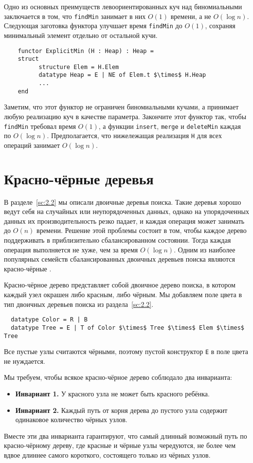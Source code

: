\begin{exercise}\label{ex:3.7}
  Одно из основных преимуществ левоориентированных куч над
  биномиальными заключается в том, что \lstinline!findMin! занимает в
  них $O(1)$ времени, а не $O(\log n)$. Следующая заготовка функтора
  улучшает время \lstinline!findMin! до $O(1)$, сохраняя минимальный
  элемент отдельно от остальной кучи.
  \begin{lstlisting}
    functor ExplicitMin (H : Heap) : Heap =
    struct
          structure Elem = H.Elem
          datatype Heap = E | NE of Elem.t $\times$ H.Heap
          ...
    end
  \end{lstlisting}
  Заметим, что этот функтор не ограничен биномиальными кучами, а
  принимает любую реализацию куч в качестве параметра. Закончите этот
  функтор так, чтобы \lstinline!findMin! требовал время $O(1)$, а
  функции \lstinline!insert!, \lstinline!merge! и
  \lstinline!deleteMin! каждая по $O(\log n)$. Предполагается, что
  нижележащая реализация \lstinline!H! для всех операций занимает
  $O(\log n)$.
\end{exercise}

\section{Красно-чёрные деревья}
\label{sc:3.3}

В разделе~\ref{sc:2.2} мы описали двоичные деревья поиска. Такие
деревья хорошо ведут себя на случайных или неупорядоченных данных,
однако на упорядоченных данных их производительность резко падает, и
каждая операция может занимать до $O(n)$  времени.  Решение этой
проблемы состоит в том, чтобы каждое дерево поддерживать в
приблизительно сбалансированном состоянии. Тогда каждая операция
выполняется не хуже, чем за время $O(\log n)$.  Одним из наиболее
популярных семейств сбалансированных двоичных деревьев поиска являются
красно-чёрные \cite{GuibasSedgewick1978}.

Красно-чёрное дерево представляет собой двоичное дерево поиска, в
котором каждый узел окрашен либо красным, либо чёрным. Мы добавляем
поле цвета в тип двоичных деревьев поиска из раздела~\ref{sc:2.2}.
\begin{lstlisting}
  datatype Color = R | B
  datatype Tree = E | T of Color $\times$ Tree $\times$ Elem $\times$ Tree
\end{lstlisting}
Все пустые узлы считаются чёрными, поэтому пустой конструктор
\lstinline!E! в поле цвета не нуждается.

Мы требуем, чтобы всякое красно-чёрное дерево соблюдало два
инварианта:
\begin{itemize}
\item \textbf{Инвариант 1.} У красного узла не может быть красного ребёнка.
\item \textbf{Инвариант 2.} Каждый путь от корня дерева до пустого
  узла содержит одинаковое количество чёрных узлов.
\end{itemize}
Вместе эти два инварианта гарантируют, что самый длинный возможный
путь по красно-чёрному дереву, где красные и чёрные узлы чередуются,
не более чем вдвое длиннее самого короткого, состоящего только из
чёрных узлов.

